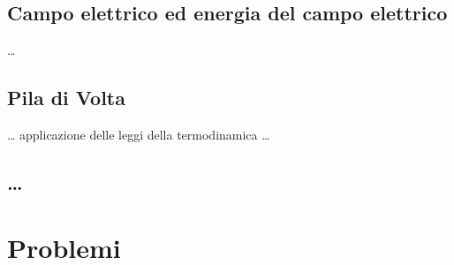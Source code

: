 \documentclass[letterpaper,10pt,italian]{jupyterBook}
\begin{document}
\subsection{Campo elettrico ed energia del campo elettrico}
\label{\detokenize{ch/electromagnetism/intro-experiments:campo-elettrico-ed-energia-del-campo-elettrico}}
\sphinxAtStartPar
…


\subsection{Pila di Volta}
\label{\detokenize{ch/electromagnetism/intro-experiments:pila-di-volta}}
\sphinxAtStartPar
… applicazione delle leggi della termodinamica …


\subsection{…}
\label{\detokenize{ch/electromagnetism/intro-experiments:id1}}
\sphinxstepscope


\section{Problemi}
\label{\detokenize{ch/electromagnetism/intro-problems:problemi}}\label{\detokenize{ch/electromagnetism/intro-problems:physics-hs-electromagnetism-intro-problems}}\label{\detokenize{ch/electromagnetism/intro-problems::doc}}
\end{document}
